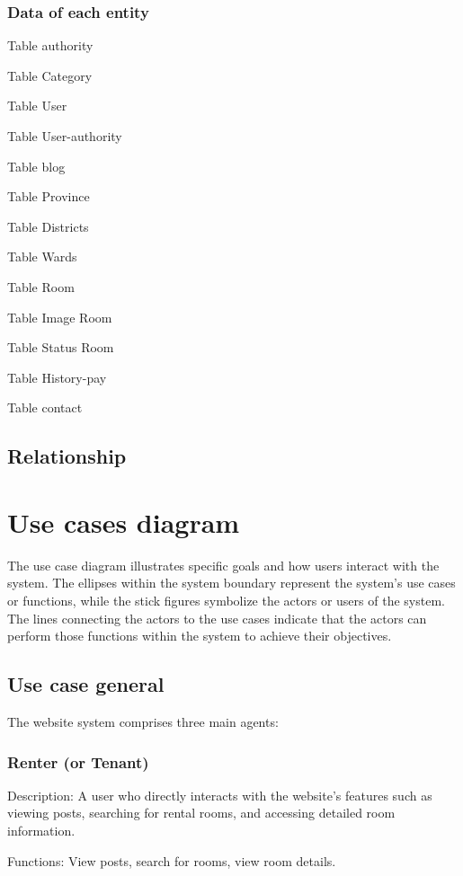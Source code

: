 \documentclass[../Main.tex]{subfiles}
\begin{document}
\subsubsection{Data of each entity}

Table authority

Table Category

Table User

Table User-authority

Table blog

Table Province

Table Districts

Table Wards

Table Room

Table Image Room

Table Status Room

Table History-pay

Table contact

\subsection{Relationship}

\section{Use cases diagram}

The use case diagram illustrates specific goals and how users interact with the system.
The ellipses within the system boundary represent the system's use cases or functions, while the stick figures symbolize the actors or users of the system.
The lines connecting the actors to the use cases indicate that the actors can perform those functions within the system to achieve their objectives.

\subsection{Use case general}

The website system comprises three main agents:
\subsubsection{Renter (or Tenant)}

Description: A user who directly interacts with the website's features such as viewing posts, searching for rental rooms, and accessing detailed room information.

Functions: View posts, search for rooms, view room details.
\end{document}
